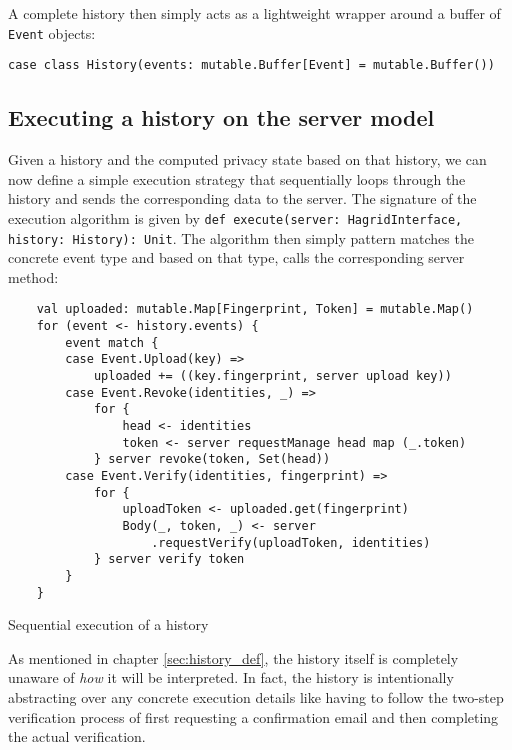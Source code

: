 A complete history then simply acts as a lightweight wrapper around a buffer of \texttt{Event} objects:
\begin{verbatim}
case class History(events: mutable.Buffer[Event] = mutable.Buffer())
\end{verbatim}

\subsection{Executing a history on the server model}
Given a history and the computed privacy state based on that history, we can now define a simple execution strategy that sequentially loops through the history and sends the corresponding data to the server. The signature of the execution algorithm is given by \texttt{def execute(server: HagridInterface, history: History): Unit}.
The algorithm then simply pattern matches the concrete event type and based on that type, calls the corresponding server method: 
\begin{code}
    \begin{verbatim}
    val uploaded: mutable.Map[Fingerprint, Token] = mutable.Map()
    for (event <- history.events) {
        event match {
        case Event.Upload(key) =>
            uploaded += ((key.fingerprint, server upload key))
        case Event.Revoke(identities, _) =>
            for {
                head <- identities
                token <- server requestManage head map (_.token)
            } server revoke(token, Set(head))
        case Event.Verify(identities, fingerprint) =>
            for {
                uploadToken <- uploaded.get(fingerprint)
                Body(_, token, _) <- server
                    .requestVerify(uploadToken, identities)
            } server verify token
        }
    }
    \end{verbatim}
    \caption{Sequential execution of a history}
\end{code}

As mentioned in chapter \ref{sec:history_def}, the history itself is completely unaware of \emph{how} it will be interpreted. In fact, the history is intentionally abstracting over any concrete execution details like having to follow the two-step verification process of first requesting a confirmation email and then completing the actual verification.


